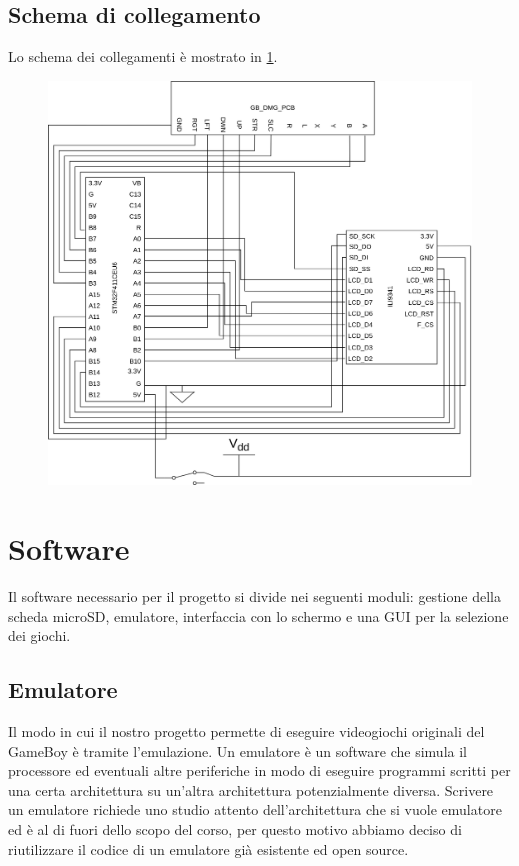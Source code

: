 \documentclass[hidelinks,12pt]{article}
\begin{document}
\subsection{Schema di collegamento}
Lo schema dei collegamenti è mostrato in \cref{fig:schema}.
\begin{figure}[h]
	\begin{center}
		\includegraphics[scale=0.65]{figures/scheme.png}
		\caption{}
		\label{fig:schema}
	\end{center}
\end{figure}

\section{Software}
Il software necessario per il progetto si divide nei seguenti moduli: gestione
della scheda microSD, emulatore, interfaccia con lo schermo e una GUI per la
selezione dei giochi.

\subsection{Emulatore}
Il modo in cui il nostro progetto permette di eseguire videogiochi originali
del GameBoy è tramite l'emulazione. Un emulatore è un software che simula il
processore ed eventuali altre periferiche in modo di eseguire
programmi scritti per una certa architettura su un'altra architettura
potenzialmente diversa.
Scrivere un emulatore richiede uno studio attento dell'architettura che si
vuole emulatore ed è al di fuori dello scopo del corso, per questo motivo
abbiamo deciso di riutilizzare il codice di un emulatore già esistente ed
open source.
\end{document}
